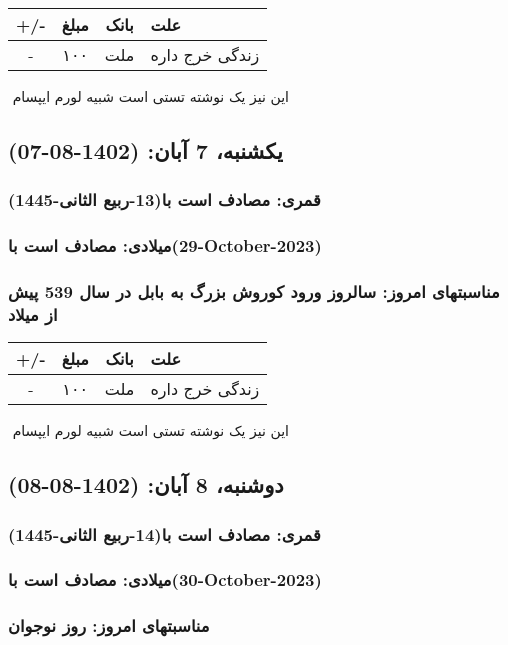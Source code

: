 \documentclass{article}
\newcommand{\rnote}[1]{\marginpar{\textcolor{color}{\StrSubstitute{\##1}{ }{\_}}}}
\newcommand{\myRow}[4]{
    #1 & #2 & #3 & #4 \\ \hline
}
\begin{document}
\begin{tabular}{ | c | c | c | p{5cm} |}
    \hline
    \myRow{ +/- }{مبلغ}{بانک}{علت}
    \myRow{-}{۱۰۰}{ملت}{زندگی خرج داره}
\end{tabular}
\newline
\newline

‌
\rnote{تست}
این نیز یک نوشته تستی است شبیه لورم ایپسام




\newpage
{}
\textcolor{color}{
\section{ یکشنبه، 7 آبان: (1402-08-07) }
\subsubsection*{قمری: مصادف است با(13-ربیع الثانی-1445)} 
\subsubsection*{میلادی: مصادف است با(29-October-2023)}
\subsubsection*{مناسبتهای امروز: سالروز ورود کوروش بزرگ به بابل در سال 539 پیش از میلاد}
}


\begin{tabular}{ | c | c | c | p{5cm} |}
    \hline
    \myRow{ +/- }{مبلغ}{بانک}{علت}
    \myRow{-}{۱۰۰}{ملت}{زندگی خرج داره}
\end{tabular}
\newline
\newline

‌
\rnote{تست}
این نیز یک نوشته تستی است شبیه لورم ایپسام




\newpage
{}
\textcolor{color}{
\section{ دوشنبه، 8 آبان: (1402-08-08) }
\subsubsection*{قمری: مصادف است با(14-ربیع الثانی-1445)} 
\subsubsection*{میلادی: مصادف است با(30-October-2023)}
\subsubsection*{مناسبتهای امروز: روز نوجوان}
}
\end{document}
